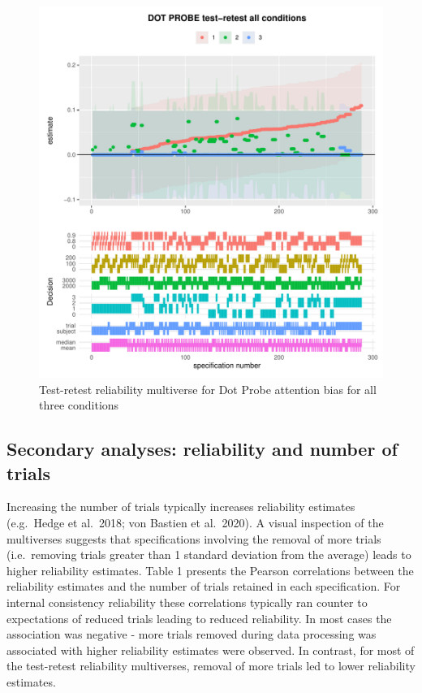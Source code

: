\documentclass[
  english,
  man,floatsintext]{apa6}
\begin{document}
\begin{figure}
\centering
\includegraphics{Reliability_Multiverse_files/figure-latex/unnamed-chunk-16-1.pdf}
\caption{\label{fig:unnamed-chunk-16}Test-retest reliability multiverse for Dot Probe attention bias for all three conditions}
\end{figure}

\hypertarget{secondary-analyses-reliability-and-number-of-trials}{%
\subsection{Secondary analyses: reliability and number of trials}\label{secondary-analyses-reliability-and-number-of-trials}}

Increasing the number of trials typically increases reliability estimates (e.g.~Hedge et al.~2018; von Bastien et al.~2020). A visual inspection of the multiverses suggests that specifications involving the removal of more trials (i.e.~removing trials greater than 1 standard deviation from the average) leads to higher reliability estimates. Table 1 presents the Pearson correlations between the reliability estimates and the number of trials retained in each specification. For internal consistency reliability these correlations typically ran counter to expectations of reduced trials leading to reduced reliability. In most cases the association was negative - more trials removed during data processing was associated with higher reliability estimates were observed. In contrast, for most of the test-retest reliability multiverses, removal of more trials led to lower reliability estimates.
\end{document}
